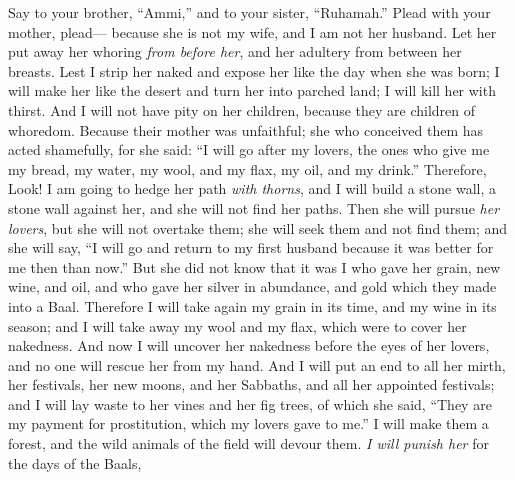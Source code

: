 \begin{biblechapter} %
 Say to your brother, “Ammi,” 
and to your sister, “Ruhamah.”
\verse Plead with your mother, plead— 
because she is not my wife, 
and I am not her husband. 
Let her put away her whoring \textit{from before her}, 
and her adultery from between her breasts.
\verse Lest I strip her naked 
and expose her like the day when she was born; 
I will make her like the desert 
and turn her into parched land; 
I will kill her with thirst.
\verse And I will not have pity on her children, 
because they are children of whoredom.
\verse Because their mother was unfaithful; 
she who conceived them has acted shamefully, 
for she said: 
“I will go after my lovers, 
the ones who give me my bread, my water, 
my wool, and my flax, 
my oil, and my drink.”
\verse Therefore, Look! 
I am going to hedge her path \textit{with thorns}, 
and I will build a stone wall, a stone wall against her, 
and she will not find her paths.
\verse Then she will pursue \textit{her lovers}, 
but she will not overtake them; 
she will seek them and not find them; 
and she will say, “I will go 
and return to my first husband 
because it was better for me then than now.”
\verse But she did not know 
that it was I who gave her 
grain, new wine, and oil, 
and who gave her silver in abundance, 
and gold which they made into a Baal.
\verse Therefore I will take again 
my grain in its time, 
and my wine in its season; 
and I will take away my wool and my flax, 
which were to cover her nakedness.
\verse And now I will uncover her nakedness 
before the eyes of her lovers, 
and no one will rescue her from my hand.
\verse And I will put an end to all her mirth, 
her festivals, her new moons, and her Sabbaths, 
and all her appointed festivals;
\verse and I will lay waste to her vines and her fig trees, 
of which she said, 
“They are my payment for prostitution, 
which my lovers gave to me.” 
I will make them a forest, 
and the wild animals of the field will devour them.
\verse \textit{I will punish her} for the days of the Baals, 

\end{biblechapter}
